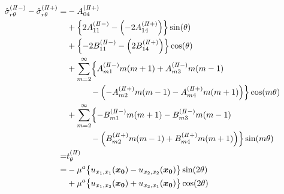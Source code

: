 \begin{align}
	\hat{\sigma}_{r\theta}^{(I\hspace{-.15em}I-)}-\hat{\sigma}_{r\theta}^{(I\hspace{-.15em}I+)} =
	&-A_{04}^{(I\hspace{-.15em}I+)}
	\nonumber
	\\
	&+\Bigl\{2A_{11}^{(I\hspace{-.15em}I-)}
	-\Bigl(-2A_{14}^{(I\hspace{-.15em}I+)}\Bigr)\Bigr\}\sin(\theta)
	\nonumber
	\\
	&+\Bigl\{-2B_{11}^{(I\hspace{-.15em}I-)}
	-\Bigl(2B_{14}^{(I\hspace{-.15em}I+)}\Bigr)\Bigr\}\cos(\theta)
	\nonumber
	\\
	&+\sum_{m=2}^{\infty}\Bigl\{
 	A_{m1}^{(I\hspace{-.15em}I-)}m(m+1)+A_{m3}^{(I\hspace{-.15em}I-)}m(m-1)
	\nonumber
	\\
	&\hspace{1.0cm}-\Bigl(-A_{m2}^{(I\hspace{-.15em}I+)}m(m-1)-A_{m4}^{(I\hspace{-.15em}I+)}m(m+1)\Bigr)
	\Bigr\}\cos(m\theta)
	\nonumber
	\\
	&+\sum_{m=2}^{\infty}\Bigl\{
	-B_{m1}^{(I\hspace{-.15em}I-)}m(m+1)-B_{m3}^{(I\hspace{-.15em}I-)}m(m-1)
	\nonumber
	\\
	&\hspace{1.0cm}-\Bigl(B_{m2}^{(I\hspace{-.15em}I+)}m(m-1)+B_{m4}^{(I\hspace{-.15em}I+)}m(m+1)\Bigr)
	\Bigr\}\sin(m\theta)
	\nonumber
	\\
	=&t_{\theta}^{(I\hspace{-.15em}I)}
	\nonumber
	\\
		=&-\mu^a \bigl\{u_{x_{1},x_{1}}(\bm{x_{0}})-u_{x_{2},x_{2}}(\bm{x_{0}})\bigr\}\sin(2\theta)
			\nonumber
			\\
			&+\mu^a \bigl\{u_{x_{1},x_{2}}(\bm{x_{0}})+u_{x_{2},x_{1}}(\bm{x_{0}})\bigr\}\cos(2\theta)
	\label{eq:SigmaRTh2eq}
\end{align}
